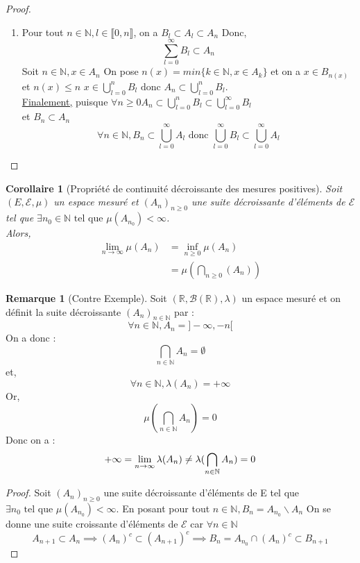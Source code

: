 \documentclass{article}[11pt]
\newtheorem{corollary}[theorem]{Corollaire}
\theoremstyle{definition}
\newtheorem{remarque}[theorem]{Remarque}
\begin{document}
\begin{proof}
\begin{enumerate}
      Donc $B_m \cap B_n = \emptyset$.
    \item Pour tout $n \in \mathbb{N}, l\in\llbracket 0,n\rrbracket$, on a $ B_l \subset A_l \subset A_n$
      Donc,  $$\sum_{l=0}^{\infty} B_l \subset A_n$$
      Soit $n\in\mathbb{N}, x \in A_n$
      On pose $n(x) = min\{k \in \mathbb{N}, x \in A_k\}$ et on a $x\in B_{n(x)}$ et $n(x) \leq n$  $\displaystyle x\in \bigcup_{l=0}^{n}B_l \text{ donc } A_n \subset \bigcup_{l =0 }^{n}B_l$.\\ 
      \underline{Finalement,} puisque $\displaystyle\forall n \geq 0 A_n \subset \bigcup_{l=0}^{n}B_l \subset \bigcup_{l=0}^{\infty} B_l$ \\ 
      et $ B_n \subset A_n $
      \[ \forall n \in \mathbb{N}, B_n \subset \bigcup_{l=0}^{\infty}A_l \text{ donc } \bigcup_{l=0}^{\infty}B_l \subset \bigcup_{l=0}^{\infty}A_l  \]
  \end{enumerate}
\end{proof}
\begin{corollary}[Propriété de continuité décroissante des mesures positives]
  Soit $(E,\mathcal{E},\mu)$ un espace mesuré et $(A_n)_{n \geq 0}$ une suite décroissante d'éléments de $\mathcal{E}$
  tel que $\exists n_0 \in \mathbb{N} \text{ tel que } \mu(A_{n_0}) < \infty$.\\ 
  Alors, 
  \begin{equation}
    \begin{split}
      \lim_{n \to \infty} \mu(A_n) &= \inf_{n \geq 0 } \mu(A_n)  \\ 
                                   &= \mu(\bigcap_{n \geq 0}(A_n))
    \end{split}
  \end{equation}
\end{corollary}
\begin{remarque}[Contre Exemple]
  Soit $(\mathbb{R}, \mathcal{B}(\mathbb{R}), \lambda)$ un espace mesuré et on définit la suite décroissante $(A_n)_{n \in \mathbb{N}}$ par :
  $$ \forall n \in \mathbb{N}, A_n = ]- \infty,-n[$$
  On a donc :
  $$ \bigcap_{n \in \mathbb{N}} A_n = \emptyset$$
  et,
  $$\forall n \in \mathbb{N}, \lambda(A_n) = + \infty$$
  Or,
  $$\mu(\bigcap_{ n \in \mathbb{N}}A_n) = 0$$
  Donc on a : 
  $$ + \infty = \lim_{n \to \infty}\lambda(A_n) \centernot = \lambda(\bigcap_{n \in \mathbb{N}}A_n) = 0$$
\end{remarque}
\begin{proof}
  Soit $(A_n)_{n \geq 0}$ une suite décroissante d'éléments de E tel que $\exists n_0 \text{ tel que } \mu(A_{n_0}) < \infty$.  En posant pour tout $n \in \mathbb{N}, B_n = A_{n_0} \backslash A_n$
  On se donne une suite croissante d'éléments de $\mathcal{E}$ car $\forall n \in \mathbb{N} $
  \[ A_{n+1}  \subset A_n \implies (A_n)^c \subset (A_{n+1})^c \implies B_n = A_{n_0} \cap (A_n)^c \subset B_{n+1} \]
  
\end{proof}
\end{document}
